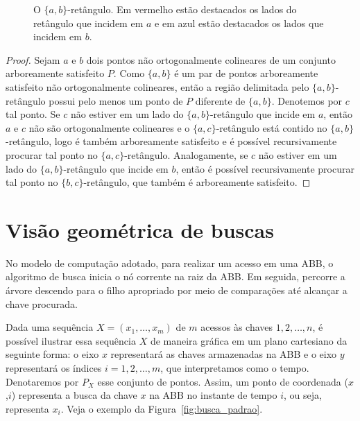 \begin{figure}
    \caption{O $\{a,b\}$-retângulo. Em vermelho estão destacados os lados do retângulo que incidem em $a$ e em azul estão destacados os lados que incidem em $b$.}
\end{figure}

\begin{proof} Sejam $a$ e $b$ dois pontos não ortogonalmente colineares de um conjunto arboreamente satisfeito $P$. Como $\{a,b\}$ é um par de pontos arboreamente satisfeito não ortogonalmente colineares, então a região delimitada pelo $\{a,b\}$-retângulo possui pelo menos um ponto de $P$ diferente de $\{a,b\}$. Denotemos por $c$ tal ponto. Se $c$ não estiver em um lado do $\{a,b\}$-retângulo que incide em $a$, então $a$ e $c$ não são ortogonalmente colineares e o $\{a,c\}$-retângulo está contido no $\{a,b\}$-retângulo, logo é também arboreamente satisfeito e é possível recursivamente procurar tal ponto no $\{a,c\}$-retângulo. Analogamente, se $c$ não estiver em um lado do $\{a,b\}$-retângulo que incide em $b$, então é possível recursivamente procurar tal ponto no $\{b,c\}$-retângulo, que também é arboreamente satisfeito.
\end{proof}


\section{Visão geométrica de buscas}

No modelo de computação adotado, para realizar um acesso em uma ABB, o algoritmo de busca inicia o nó corrente na raiz da ABB. Em seguida, percorre a árvore descendo para o filho apropriado por meio de comparações até alcançar a chave procurada.

Dada uma sequência $X = (x_{1},\ldots,x_{m})$ de $m$ acessos às chaves $1,2,\ldots,n$, é possível ilustrar essa sequência $X$ de maneira gráfica em um plano cartesiano da seguinte forma: o eixo $x$ representará as chaves armazenadas na ABB e o eixo $y$ representará os índices $i = 1,2,\ldots,m$, que interpretamos como o tempo. Denotaremos por $P_X$ esse conjunto de pontos. Assim, um ponto de coordenada ($x$,$i$) representa a busca da chave $x$ na ABB no instante de tempo $i$, ou seja, representa $x_i$. Veja o exemplo da Figura~\ref{fig:busca_padrao}.

